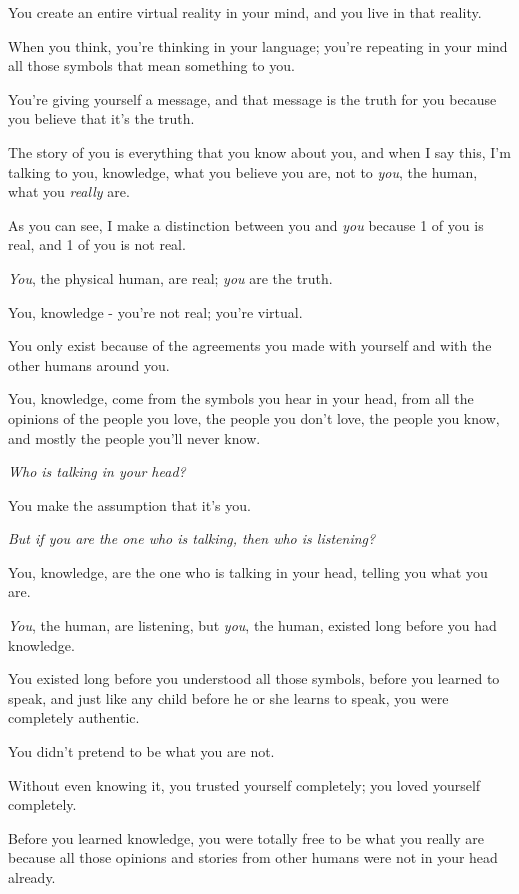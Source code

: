 \documentclass{article}
\numberwithin{equation}{section}
\begin{document}
You create an entire virtual reality in your mind, and you live in that reality.

When you think, you're thinking in your language; you're repeating in your mind all those symbols that mean something to you.

You're giving yourself a message, and that message is the truth for you because you believe that it's the truth.

%
The story of you is everything that you know about you, and when I say this, I'm talking to you, knowledge, what you believe you are, not to \textit{you}, the human, what you \textit{really} are.

As you can see, I make a distinction between you and \textit{you} because 1 of you is real, and 1 of you is not real.

\textit{You}, the physical human, are real; \textit{you} are the truth.

You, knowledge - you're not real; you're virtual.

You only exist because of the agreements you made with yourself and with the other humans around you.

You, knowledge, come from the symbols you hear in your head, from all the opinions of the people you love, the people you don't love, the people you know, and mostly the people you'll never know.

%
\textit{Who is talking in your head?}

You make the assumption that it's you.

\textit{But if you are the one who is talking, then who is listening?}

You, knowledge, are the one who is talking in your head, telling you what you are.

\textit{You}, the human, are listening, but \textit{you}, the human, existed long before you had knowledge.

You existed long before you understood all those symbols, before you learned to speak, and just like any child before he or she learns to speak, you were completely authentic.

You didn't pretend to be what you are not.

Without even knowing it, you trusted yourself completely; you loved yourself completely.

Before you learned knowledge, you were totally free to be what you really are because all those opinions and stories from other humans were not in your head already.
\end{document}
